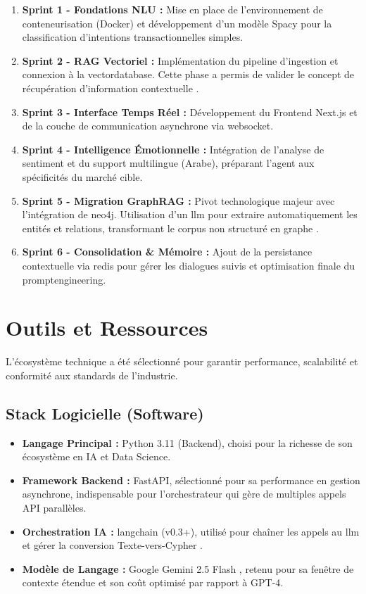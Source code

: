 \begin{enumerate}
    \item \textbf{Sprint 1 - Fondations NLU :} Mise en place de l'environnement de \gls{conteneurisation} (Docker) et développement d'un modèle Spacy pour la classification d'intentions transactionnelles simples.
    \item \textbf{Sprint 2 - RAG Vectoriel :} Implémentation du pipeline d'ingestion et connexion à la \gls{vectordatabase}. Cette phase a permis de valider le concept de récupération d'information contextuelle \cite{lewis2020}.
    \item \textbf{Sprint 3 - Interface Temps Réel :} Développement du Frontend Next.js et de la couche de communication asynchrone via \gls{websocket}.
    \item \textbf{Sprint 4 - Intelligence Émotionnelle :} Intégration de l'analyse de sentiment et du support multilingue (Arabe), préparant l'agent aux spécificités du marché cible.
    \item \textbf{Sprint 5 - Migration GraphRAG :} Pivot technologique majeur avec l'intégration de \gls{neo4j}. Utilisation d'un \gls{llm} pour extraire automatiquement les entités et relations, transformant le corpus non structuré en graphe \cite{edge2024}.
    \item \textbf{Sprint 6 - Consolidation \& Mémoire :} Ajout de la persistance contextuelle via \gls{redis} pour gérer les dialogues suivis et optimisation finale du \gls{promptengineering}.
\end{enumerate}

\section{Outils et Ressources}

L'écosystème technique a été sélectionné pour garantir performance, scalabilité et conformité aux standards de l'industrie.

\subsection{Stack Logicielle (Software)}
\begin{itemize}
    \item \textbf{Langage Principal :} Python 3.11 (Backend), choisi pour la richesse de son écosystème en IA et Data Science.
    \item \textbf{Framework Backend :} FastAPI, sélectionné pour sa performance en gestion asynchrone, indispensable pour l'\gls{orchestrateur} qui gère de multiples appels API parallèles.
    \item \textbf{Orchestration IA :} \gls{langchain} (v0.3+), utilisé pour chaîner les appels au \gls{llm} et gérer la conversion Texte-vers-Cypher \cite{langchain2024}.
    \item \textbf{Modèle de Langage :} Google Gemini 2.5 Flash \cite{google2024}, retenu pour sa fenêtre de contexte étendue et son coût optimisé par rapport à GPT-4.
\end{itemize}

